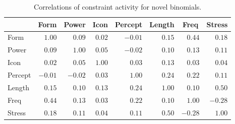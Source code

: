 \documentclass[authoryear]{elsarticle}
\begin{document}
\begin{table}[!tbp]
\begin{center}
\begin{tabular}{lrrrrrrr}
\hline\hline
\multicolumn{1}{l}{}&\multicolumn{1}{c}{Form}&\multicolumn{1}{c}{Power}&\multicolumn{1}{c}{Icon}&\multicolumn{1}{c}{Percept}&\multicolumn{1}{c}{Length}&\multicolumn{1}{c}{Freq}&\multicolumn{1}{c}{Stress}\tabularnewline
\hline
Form&$ 1.00$&$ 0.09$&$0.02$&$-0.01$&$0.15$&$ 0.44$&$ 0.18$\tabularnewline
Power&$ 0.09$&$ 1.00$&$0.05$&$-0.02$&$0.10$&$ 0.13$&$ 0.11$\tabularnewline
Icon&$ 0.02$&$ 0.05$&$1.00$&$ 0.03$&$0.13$&$ 0.03$&$ 0.04$\tabularnewline
Percept&$-0.01$&$-0.02$&$0.03$&$ 1.00$&$0.24$&$ 0.22$&$ 0.11$\tabularnewline
Length&$ 0.15$&$ 0.10$&$0.13$&$ 0.24$&$1.00$&$ 0.10$&$ 0.50$\tabularnewline
Freq&$ 0.44$&$ 0.13$&$0.03$&$ 0.22$&$0.10$&$ 1.00$&$-0.28$\tabularnewline
Stress&$ 0.18$&$ 0.11$&$0.04$&$ 0.11$&$0.50$&$-0.28$&$ 1.00$\tabularnewline
\hline
\end{tabular}
\end{center}
\caption{Correlations of constraint activity for novel binomials.} \label{t:constraint-cor-n}

\end{table}



\end{document}
